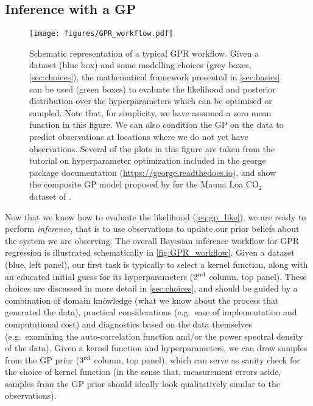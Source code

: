 \documentclass[letterpaper]{ar-1col}
\newcommand{\project}[1]{\textsf{#1}}
\begin{document}
\subsection{Inference with a GP}\label{sec:gp-inf}

\begin{figure}[ht]
  \centering
  \texttt{[image: figures/GPR\_workflow.pdf]}
  \caption{Schematic representation of a typical GPR workflow. Given a dataset (blue box) and some modelling choices (grey boxes, \autoref{sec:choices}), the mathematical framework presented in \autoref{sec:basics} can be used (green boxes) to evaluate the likelihood and posterior distribution over the hyperparameters which can be optimised or sampled. Note that, for simplicity, we have assumed a zero mean function in this figure. We can also condition the GP on the data to predict observations at locations where we do not yet have observations. Several of the plots in this figure are taken from the 
  tutorial on hyperparameter optimization included in the \project{george} package documentation (\url{https://george.readthedocs.io}), and show the composite GP model proposed by \citet{gpml} for the Mauna Loa CO$_2$ dataset of \citet{MaunaLoaCO2}.}  
  \label{fig:GPR_workflow}
\end{figure}

Now that we know how to evaluate the likelihood (\autoref{eq:gp_like}), we are ready to perform \textit{inference}, that is to use observations to update our prior beliefs about the system we are observing. The overall Bayesian inference workflow for GPR regression is illustrated schematically in \autoref{fig:GPR_workflow}. Given a dataset (blue, left panel), our first task is typically to select a kernel function, along with an educated initial guess for its hyperparameters ($2^{\rm nd}$ column, top panel). These choices are discussed in more detail in \autoref{sec:choices}, and should be guided by a combination of domain knowledge (what we know about the process that generated the data), practical considerations (e.g.\ ease of implementation and computational cost) and diagnostics based on the data themselves (e.g.\ examining the auto-correlation function and/or the power spectral density of the data). Given a kernel function and hyperparameters, we can draw samples from the GP prior ($3^{\rm rd}$ column, top panel), which can serve as sanity check for the choice of kernel function (in the sense that, measurement errors aside, samples from the GP prior should ideally look qualitatively similar to the observations). 
\end{document}
